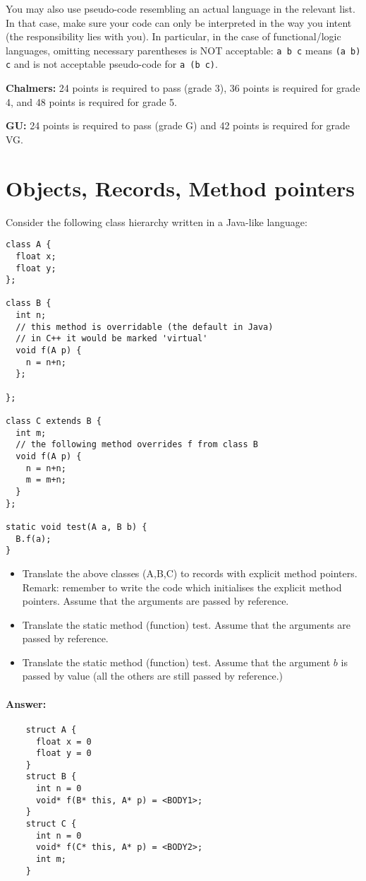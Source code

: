 \documentclass{article}
\newcommand{\answer}[0]{\paragraph{Answer:}}
\begin{document}
You may also use pseudo-code resembling an actual language in the
relevant list. In that case, make sure your code can only be
interpreted in the way you intent (the responsibility lies with
you). In particular, in the case of functional/logic languages,
omitting necessary parentheses is NOT acceptable: \texttt{a b c} means
\texttt{(a b) c} and is not acceptable pseudo-code for \texttt{a (b
  c)}.


\textbf{Chalmers:}
24 points is required to pass (grade 3), 36 points is required for
grade 4, and 48 points is required for grade 5.

\textbf{GU:}
24 points is required to pass (grade G) and 42 points is
required for grade VG.

\section{Objects, Records, Method pointers}
Consider the following class hierarchy written in a Java-like
language:
\begin{verbatim}
class A {
  float x;
  float y;
};

class B {
  int n;
  // this method is overridable (the default in Java)
  // in C++ it would be marked 'virtual'
  void f(A p) {
    n = n+n;
  };

};

class C extends B {
  int m;
  // the following method overrides f from class B
  void f(A p) {
    n = n+n;
    m = m+n;
  }
};

static void test(A a, B b) {
  B.f(a);
}
\end{verbatim}

\begin{itemize}
\item Translate the above classes (A,B,C) to records with explicit method
  pointers.  Remark: remember to write the code which initialises the
  explicit method pointers. Assume that the arguments are passed by
  reference.  
\item Translate the static method (function) test. Assume that the
  arguments are passed by reference.  
\item Translate the static method (function) test. Assume that the
  argument $b$ is passed by value (all the others are still passed by
  reference.)  
\end{itemize}

\answer{
\begin{verbatim}
    struct A {
      float x = 0
      float y = 0
    }
    struct B {
      int n = 0
      void* f(B* this, A* p) = <BODY1>;
    }
    struct C {
      int n = 0
      void* f(C* this, A* p) = <BODY2>;
      int m;
    }
\end{verbatim}
}
\end{document}
